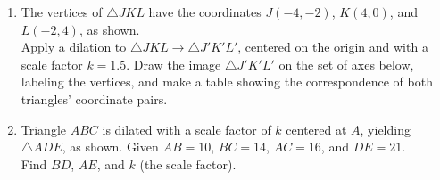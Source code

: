 \documentclass[12pt, twoside]{article}
\begin{document}
\begin{enumerate}
\newpage
\item The vertices of $\triangle JKL$ have the coordinates $J(-4,-2)$, $K(4,0)$, and $L(-2,4)$, as shown. \\[0.25cm]
  Apply a dilation to $\triangle JKL \rightarrow \triangle J'K'L'$, centered on the origin and with a scale factor $k=1.5$. Draw the image $\triangle J'K'L'$ on the set of axes below, labeling the vertices, and make a table showing the correspondence of both triangles' coordinate pairs.  \vspace{4cm}
  \begin{center}
  \end{center}

\newpage
\item Triangle $ABC$ is dilated with a scale factor of $k$ centered at $A$, yielding $\triangle ADE$, as shown. Given $AB=10$, $BC=14$, $AC=16$, and $DE=21$. \\[0.25cm] Find $BD$, $AE$, and $k$ (the scale factor). \vspace{0.5cm}
\begin{center}
  \end{center}
\vspace{4cm}



\end{enumerate}
\end{document}
